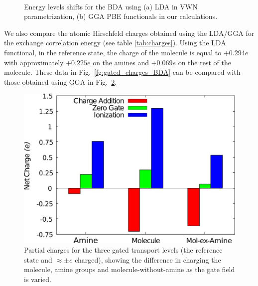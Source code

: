 \documentclass[aip,jcp,a4paper,reprint,floatfix,superscriptaddress]{revtex4-1}
\begin{document}
\begin{figure}
\\
\caption{Energy levels shifts for the BDA using (a) LDA in VWN parametrization, (b) GGA PBE functionals in our calculations.}\label{fg:shifts-gates}
\end{figure}

We also compare the atomic Hirschfeld charges obtained using the LDA/GGA for the exchange correlation energy (see table \ref{tab:charges}). Using the LDA functional, in the reference state, the charge of the molecule is equal to $+0.294e$ with approximately $+0.225e$ on the amines and $+0.069e$ on the rest of the molecule. These data in Fig.~\ref{fg:gated_charges_BDA} can be compared with those obtained using GGA in Fig.~\ref{fg:gated_charges_BDA-LDA}.


\begin{figure}
\includegraphics[width=.5\columnwidth]{gating-BDA-LDA-N}
\caption{Partial charges for the three gated transport levels (the reference state and $\approx\pm e$ charged), showing the difference in charging the molecule, amine groups and molecule-without-amine as the gate field is varied.} \label{fg:gated_charges_BDA-LDA}
\end{figure}
\end{document}
